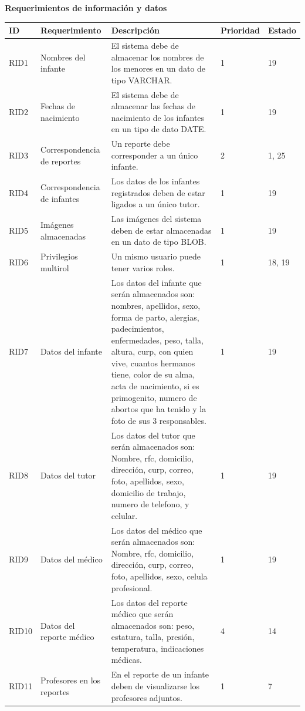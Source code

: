 \documentclass{article}
\begin{document}
	\textbf{Requerimientos de información y datos} \\
	\begin{longtable}{|p{1.0cm}|p{3.0cm}|p{5.0cm}|p{1.2cm}|p{0.75cm}|}
	\hline
	\textbf{ID} & \textbf{Requerimiento} & \textbf{Descripción} & \textbf{Prioridad} & \textbf{Estado} \\
	\hline
	RID1 & Nombres del infante & El sistema debe de almacenar los nombres de los menores en un dato de tipo VARCHAR. & 1 & 19 \\
	\hline
	RID2 & Fechas de nacimiento & El sistema debe de almacenar las fechas de nacimiento de los infantes en un tipo de dato DATE. & 1 & 19 \\
	\hline
	RID3 & Correspondencia de reportes & Un reporte debe corresponder a un único infante. & 2 & 1, 25 \\
	\hline
	RID4 & Correspondencia de infantes & Los datos de los infantes registrados deben de estar ligados a un único tutor. & 1 & 19 \\
	\hline
	RID5 & Imágenes almacenadas & Las imágenes del sistema deben de estar almacenadas en un dato de tipo BLOB. & 1 & 19 \\
	\hline
	RID6 & Privilegios multirol & Un mismo usuario puede tener varios roles. & 1 & 18, 19 \\
	\hline
	RID7 & Datos del infante & Los datos del infante que serán almacenados son: nombres, apellidos, sexo, forma de parto, alergias, padecimientos, enfermedades, peso, talla, altura, curp, con quien vive, cuantos hermanos tiene, color de su alma, acta de nacimiento, si es primogenito, numero de abortos que ha tenido y la foto de sus 3 responsables. & 1 & 19 \\
	\hline
	RID8 & Datos del tutor & Los datos del tutor que serán almacenados son:  Nombre, rfc, domicilio, dirección, curp, correo, foto, apellidos, sexo, domicilio de trabajo, numero de telefono, y celular. & 1 & 19 \\
	\hline
	RID9 & Datos del médico & Los datos del médico que serán almacenados son:  Nombre, rfc, domicilio, dirección, curp, correo, foto, apellidos, sexo, celula profesional. & 1 & 19 \\
	\hline
	RID10 & Datos del reporte médico & Los datos del reporte médico que serán almacenados son: peso, estatura, talla, presión, temperatura, indicaciones médicas. & 4 & 14 \\
	\hline
	RID11 & Profesores en los reportes & En el reporte de un infante deben de visualizarse los profesores adjuntos. & 1 & 7 \\

\end{longtable}
\end{document}
